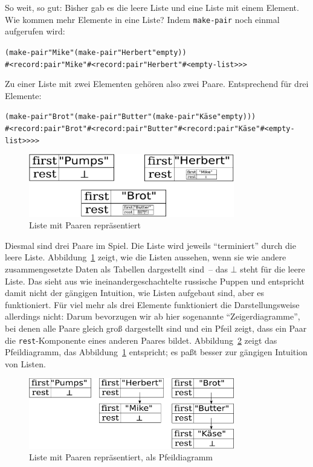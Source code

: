 So weit, so gut: Bisher gab es die leere Liste und eine Liste mit einem
Element.  Wie kommen mehr Elemente in eine Liste?  Indem
\texttt{make-pair} noch einmal aufgerufen wird:
%
\begin{alltt}
(make-pair "Mike" (make-pair "Herbert" empty))
\evalsto{}#<record:pair "Mike" #<record:pair "Herbert" #<empty-list>>>
\end{alltt}
%
Zu einer Liste mit zwei Elementen gehören also zwei Paare.
Entsprechend für drei Elemente:
%
\begin{alltt}
(make-pair "Brot" (make-pair "Butter" (make-pair "Käse" empty)))
\evalsto{}#<record:pair "Brot" #<record:pair "Butter" #<record:pair "Käse" #<empty-list>>>>
\end{alltt}
%
\begin{figure}[tb]
  \centering
  \includegraphics[width=0.8\textwidth]{pair-lists1}
  \caption{Liste mit Paaren repräsentiert}
  \label{fig:pair-lists-1}
\end{figure}
Diesmal sind drei Paare im Spiel.  Die Liste wird jeweils
"`terminiert"' durch die leere Liste.  Abbildung~\ref{fig:pair-lists-1}
zeigt, wie die Listen aussehen, wenn sie wie andere zusammengesetzte
Daten als Tabellen dargestellt sind~-- das $\bot$ steht für die leere
Liste. Das sieht aus wie ineinandergeschachtelte russische Puppen und
entspricht damit nicht der gängigen Intuition, wie Listen aufgebaut
sind, aber es funktioniert.  Für viel mehr als drei Elemente
funktioniert die Darstellungsweise allerdings nicht: Darum bevorzugen
wir ab hier sogenannte "`Zeigerdiagramme"', bei denen alle Paare gleich groß
dargestellt sind und ein Pfeil zeigt, dass ein Paar die
\texttt{rest}-Komponente eines anderen Paares bildet.
Abbildung~\ref{fig:pair-lists-2} zeigt das Pfeildiagramm, das
Abbildung~\ref{fig:pair-lists-1} entspricht; es paßt besser zur
gängigen Intuition von Listen.

\begin{figure}[tb]
  \centering
  \includegraphics[width=0.8\textwidth]{pair-lists2}
  \caption{Liste mit Paaren repräsentiert, als Pfeildiagramm}
  \label{fig:pair-lists-2}
\end{figure}


